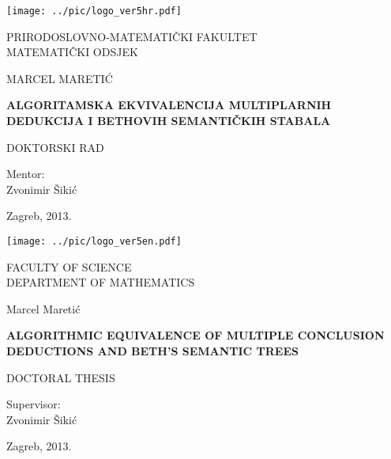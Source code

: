 \documentclass[a4paper,12pt]{article}
\begin{document}
\newpage
\strut \cleardoublepage

\begin{center}

\texttt{[image: ../pic/logo\_ver5hr.pdf]}

\fontsize{16pt}{30pt}\selectfont
 \textsf{PRIRODOSLOVNO-MATEMATIČKI FAKULTET\\ MATEMATIČKI ODSJEK}



\vspace*{2.5cm}
\textsf{MARCEL MARETIĆ}

\vspace*{2.5cm}
{\fontsize{22pt}{30pt}\selectfont
\textbf{
\textsf{ALGORITAMSKA EKVIVALENCIJA MULTIPLARNIH DEDUKCIJA I BETHOVIH SEMANTIČKIH STABALA}
}
}


\vspace*{2cm}
\textsf{DOKTORSKI RAD}

\vspace*{1cm}
\textsf{Mentor:\\
Zvonimir Šikić}

\vfill{
\textsf{Zagreb, 2013.}
}

\end{center}

\newpage
\strut \cleardoublepage


\thispagestyle{empty}

\begin{center}

\texttt{[image: ../pic/logo\_ver5en.pdf]}

\fontsize{16pt}{30pt}\selectfont
 \textsf{FACULTY OF SCIENCE\\ DEPARTMENT OF MATHEMATICS}



\vspace*{2.5cm}
{\fontsize{16pt}{26pt}\selectfont
\textsf{Marcel Maretić}
}

\vspace*{2.5cm}
{\fontsize{22pt}{30pt}\selectfont
\textbf{
\textsf{ALGORITHMIC EQUIVALENCE OF MULTIPLE CONCLUSION DEDUCTIONS AND BETH'S SEMANTIC TREES}
}
}


\vspace*{1.5cm}
\textsf{DOCTORAL THESIS}

\vspace*{1cm}
\textsf{Supervisor:\\
Zvonimir Šikić}

\vfill{
\fontsize{14pt}{20pt}\selectfont
\textsf{Zagreb, 2013.}
}

\end{center}
\end{document}

